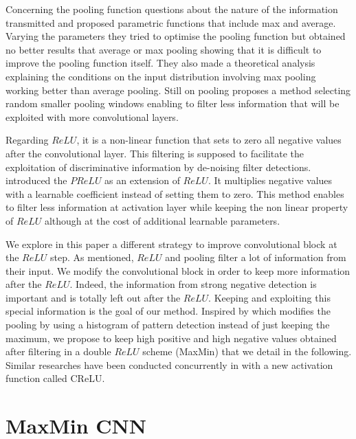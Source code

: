 \documentclass{article}
\begin{document}
Concerning the pooling function \cite{theoretical} questions about the nature of the information transmitted and proposed parametric functions that include max and average. Varying the parameters they tried to optimise the pooling function but obtained no better results that average or max pooling showing that it is difficult to improve the pooling function itself. They also made a theoretical analysis explaining the conditions on the input distribution involving max pooling working better than average pooling. Still on pooling  \cite{fractional} proposes a method selecting random smaller pooling windows enabling to filter less information that will be exploited with more convolutional layers.  

Regarding $ReLU$, it is a non-linear function that sets to zero all negative values after the convolutional layer. This filtering is supposed to facilitate the exploitation of discriminative information by de-noising filter detections. \cite{prelu} introduced the $PReLU$ as an extension of $ReLU$. It multiplies negative values with a learnable coefficient instead of setting them to zero. This method enables to filter less information at activation layer while keeping the non linear property of $ReLU$ although at the cost of additional learnable parameters. 

We explore in this paper a different strategy to improve convolutional block at the $ReLU$ step. As mentioned, $ReLU$ and pooling filter a lot of information from their input. 
We modify the convolutional block in order to keep more information after the $ReLU$. Indeed, the information from strong negative detection is important and is totally left out after the $ReLU$. Keeping and exploiting this special information is the goal of our method. 
Inspired by \cite{bossanova, avilaCVIU2013} which modifies the pooling by using a histogram of pattern detection instead of just keeping the maximum, we propose to keep high positive and high negative values obtained after filtering in a double $ReLU$ scheme (MaxMin) that we detail in the following. Similar researches have been conducted concurrently in \cite{crelu} with a new activation function called CReLU. 

\section{MaxMin CNN}
\label{sec:pagestyle}
\end{document}
